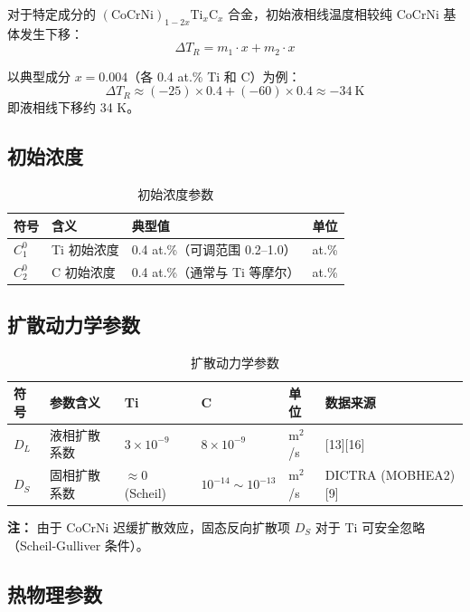 \documentclass[12pt, a4paper]{article}
\begin{document}
对于特定成分的 $(\text{CoCrNi})_{1-2x}\text{Ti}_x\text{C}_x$ 合金，初始液相线温度相较纯 CoCrNi 基体发生下移：
\[
  \Delta T_R = m_1 \cdot x + m_2 \cdot x
\]

以典型成分 $x = 0.004$（各 0.4 at.\% Ti 和 C）为例：
\[
  \Delta T_R \approx (-25) \times 0.4 + (-60) \times 0.4 \approx -34\ \text{K}
\]
即液相线下移约 34 K。

\subsection{初始浓度}

\begin{table}[h!]
\centering
\caption{初始浓度参数}
\begin{tabular}{llll}
\toprule
符号 & 含义 & 典型值 & 单位 \\
\midrule
$C_1^0$ & Ti 初始浓度 & 0.4 at.\%（可调范围 0.2–1.0） & at.\% \\
$C_2^0$ & C 初始浓度 & 0.4 at.\%（通常与 Ti 等摩尔） & at.\% \\
\bottomrule
\end{tabular}
\end{table}

\subsection{扩散动力学参数}

\begin{table}[h!]
\centering
\caption{扩散动力学参数}
\begin{tabular}{llllll}
\toprule
符号 & 参数含义 & Ti & C & 单位 & 数据来源 \\
\midrule
$D_L$ & 液相扩散系数 & $3\times10^{-9}$ & $8\times10^{-9}$ & m$^2$/s & [13][16] \\
$D_S$ & 固相扩散系数 & $\approx 0$ (Scheil) & $10^{-14} \sim 10^{-13}$ & m$^2$/s & DICTRA (MOBHEA2) [9] \\
\bottomrule
\end{tabular}
\end{table}

\noindent\textbf{注：} 由于 CoCrNi 迟缓扩散效应，固态反向扩散项 $D_S$ 对于 Ti 可安全忽略（Scheil-Gulliver 条件）。

\subsection{热物理参数}
\end{document}
